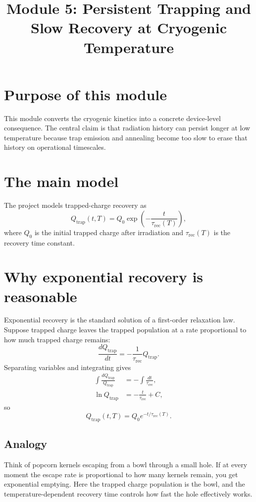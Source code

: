 \documentclass[11pt]{article}
\begin{document}
\title{Module 5: Persistent Trapping and Slow Recovery at Cryogenic Temperature}
\author{}
\date{}
\maketitle

\section{Purpose of this module}
This module converts the cryogenic kinetics into a concrete device-level consequence. The central claim is that radiation history can persist longer at low temperature because trap emission and annealing become too slow to erase that history on operational timescales.

\section{The main model}
The project models trapped-charge recovery as
\begin{equation}
Q_{\mathrm{trap}}(t,T) = Q_0 \exp\!\left(-\frac{t}{\tau_{\mathrm{rec}}(T)}\right),
\end{equation}
where $Q_0$ is the initial trapped charge after irradiation and $\tau_{\mathrm{rec}}(T)$ is the recovery time constant.

\section{Why exponential recovery is reasonable}
Exponential recovery is the standard solution of a first-order relaxation law. Suppose trapped charge leaves the trapped population at a rate proportional to how much trapped charge remains:
\begin{equation}
\frac{dQ_{\mathrm{trap}}}{dt} = -\frac{1}{\tau_{\mathrm{rec}}}Q_{\mathrm{trap}}.
\end{equation}
Separating variables and integrating gives
\begin{align}
\int \frac{dQ_{\mathrm{trap}}}{Q_{\mathrm{trap}}} &= -\int \frac{dt}{\tau_{\mathrm{rec}}}, \\
\ln Q_{\mathrm{trap}} &= -\frac{t}{\tau_{\mathrm{rec}}}+C,
\end{align}
so
\begin{equation}
Q_{\mathrm{trap}}(t,T)=Q_0 e^{-t/\tau_{\mathrm{rec}}(T)}.
\end{equation}

\subsection{Analogy}
Think of popcorn kernels escaping from a bowl through a small hole. If at every moment the escape rate is proportional to how many kernels remain, you get exponential emptying. Here the trapped charge population is the bowl, and the temperature-dependent recovery time controls how fast the hole effectively works.
\end{document}
